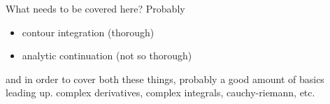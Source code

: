 \documentclass[main.tex]{subfiles}
\begin{document}
What needs to be covered here? Probably
\begin{itemize}
\item contour integration (thorough)

\item analytic continuation (not so thorough)
\end{itemize}
and in order to cover both these things, probably a good amount of basics leading up. complex derivatives, complex integrals, cauchy-riemann, etc.
\end{document}
